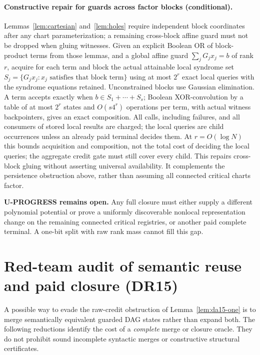 \documentclass[11pt]{article}
\begin{document}
\paragraph{Constructive repair for guards across factor blocks (conditional).}
Lemmas~\ref{lem:cartesian} and~\ref{lem:holes} require independent block coordinates after any chart parameterization; a remaining cross-block affine guard must not be dropped when gluing witnesses. Given an explicit Boolean OR of block-product terms from those lemmas, and a global affine guard $\sum_jG_jx_j=b$ of rank $r$, acquire for each term and block the actual attainable local syndrome set $S_j=\{G_jx_j:x_j\text{ satisfies that block term}\}$ using at most $2^r$ exact local queries with the syndrome equations retained. Unconstrained blocks use Gaussian elimination. A term accepts exactly when $b\in S_1+\cdots+S_s$; Boolean XOR-convolution by a table of at most $2^r$ states and $O(s4^r)$ operations per term, with actual witness backpointers, gives an exact composition. All calls, including failures, and all consumers of stored local results are charged; the local queries are child occurrences unless an already paid terminal decides them. At $r=O(\log N)$ this bounds acquisition and composition, not the total cost of deciding the local queries; the aggregate credit gate must still cover every child. This repairs cross-block gluing without asserting universal availability. It complements the persistence obstruction above, rather than assuming all connected critical charts factor.

\noindent\textbf{U-PROGRESS remains open.} Any full closure must either supply a different polynomial potential or prove a uniformly discoverable nonlocal representation change on the remaining connected critical registries, or another paid complete terminal. A one-bit split with raw rank mass cannot fill this gap.


\section{Red-team audit of semantic reuse and paid closure (DR15)}\label{sec:dr15}
A possible way to evade the raw-credit obstruction of Lemma~\ref{lem:da15-one} is to merge semantically equivalent guarded DAG states rather than expand both. The following reductions identify the cost of a \emph{complete} merge or closure oracle. They do not prohibit sound incomplete syntactic merges or constructive structural certificates.
\end{document}
